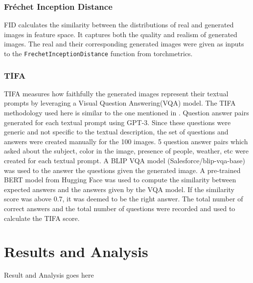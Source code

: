 \documentclass{article}
\begin{document}
\subsubsection{Fréchet Inception Distance}
FID calculates the similarity between the distributions of real and generated images 
in feature space. It captures both the quality and realism of generated images. The real and their corresponding generated images 
were given as inputs to the \texttt{FrechetInceptionDistance} function from torchmetrics.

\subsubsection{TIFA}
TIFA measures how faithfully the generated images represent their textual prompts 
by leveraging a Visual Question Answering(VQA) model. The TIFA methodology used here is similar to the one mentioned in \cite{Yushi2023}. Question answer pairs generated for each 
textual prompt using GPT-3. Since these questions were generic and not specific to the textual description, 
the set of questions and answers were created manually for the 100 images. 5 question answer pairs which asked about 
the subject, color in the image, presence of people, weather, etc were created for each textual prompt. A BLIP VQA model 
(Salesforce/blip-vqa-base) was used to the answer the questions given the generated image. A pre-trained BERT model from Hugging Face 
was used to compute the similarity between expected answers and the answers 
given by the VQA model. If the similarity score was above 0.7, it was deemed to be the right answer. 
The total number of correct answers and the total number of questions were recorded and used to calculate the 
TIFA score.

\section{Results and Analysis}
Result and Analysis goes here


\end{document}
